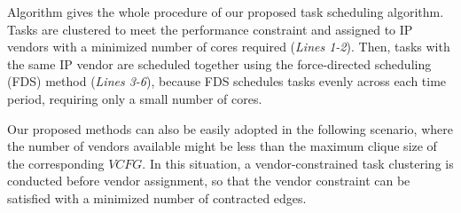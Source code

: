 \documentclass[10pt,journal, compsoc]{IEEEtran}
\begin{document}

Algorithm  gives the whole procedure of our proposed task scheduling algorithm. Tasks are clustered to meet the performance constraint and assigned to IP vendors with a minimized number of cores required (\textit{Lines 1-2}). Then, tasks with the same IP vendor are scheduled together using the force-directed scheduling (FDS) method \cite{article:PP} (\textit{Lines 3-6}), because FDS schedules tasks evenly across each time period, requiring only a small number of cores. %

Our proposed methods can also be easily adopted in the following scenario, where the number of vendors available might be less than the maximum clique size of the corresponding $VCFG$. In this situation, a vendor-constrained task clustering \cite{article:NW} is conducted before vendor assignment, so that the vendor constraint can be satisfied with a minimized number of contracted edges.%
\end{document}

